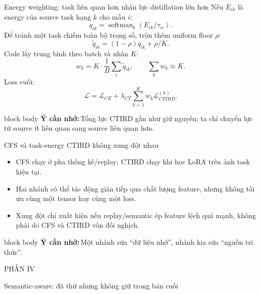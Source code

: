 \documentclass[aspectratio=169,10pt]{beamer}
\newcommand{\remember}[1]{%
  \par\vspace{0.12cm}%
  \begin{beamercolorbox}[wd=\linewidth,sep=0.11cm,leftskip=0.08cm,rightskip=0.08cm,rounded=true]{block body}
    \footnotesize\textbf{\color{HRMBlue}Ý cần nhớ:}\,\color{HRMDark}#1
  \end{beamercolorbox}
}
\newcommand{\sectionframe}[2]{%
  \begin{frame}[plain]
    \vfill
    {\large\color{HRMBlue}#1}\par\vspace{0.35cm}
    {\Huge\color{HRMDark}#2}\par
    \vfill
  \end{frame}
}
\begin{document}
\begin{frame}{Energy weighting: task liên quan hơn nhận lực distillation lớn hơn}
  Nếu $E_{ik}$ là energy của source task hạng $k$ cho mẫu $i$:
  \[
    q_{ik}=\operatorname{softmax}_k(E_{ik}/\tau_w).
  \]
  Để tránh một task chiếm toàn bộ trọng số, trộn thêm uniform floor $\rho$:
  \[
    \tilde q_{ik}=(1-\rho)q_{ik}+\rho/K.
  \]
  Code lấy trung bình theo batch và nhân $K$:
  \[
    w_k=K\cdot\frac{1}{B}\sum_i\tilde q_{ik},
    \qquad \sum_k w_k\approx K.
  \]
  Loss cuối:
  \[
    \mathcal L=\mathcal L_{CE}+\lambda_{CT}\sum_{k=1}^{K}w_k\mathcal L_{CTIRD}^{(k)}.
  \]
  \remember{Tổng lực CTIRD gần như giữ nguyên; ta chỉ chuyển lực từ source ít liên quan sang source liên quan hơn.}
\end{frame}

\begin{frame}{CFS và task-energy CTIRD không xung đột nhau}
  \centering

  \vspace{0.45cm}
  \begin{itemize}\setlength\itemsep{0.25cm}
    \item CFS chạy ở pha thống kê/replay; CTIRD chạy khi học LoRA trên ảnh task hiện tại.
    \item Hai nhánh có thể tác động gián tiếp qua chất lượng feature, nhưng không tối ưu cùng một tensor hay cùng một loss.
    \item Xung đột chỉ xuất hiện nếu replay/semantic ép feature lệch quá mạnh, không phải do CFS và CTIRD vốn đối nghịch.
  \end{itemize}
  \remember{Một nhánh sửa ``dữ liệu nhớ'', nhánh kia sửa ``nguồn tri thức''.}
\end{frame}

\sectionframe{PHẦN IV}{Semantic-aware: đã thử nhưng không giữ trong bản cuối}
\end{document}
